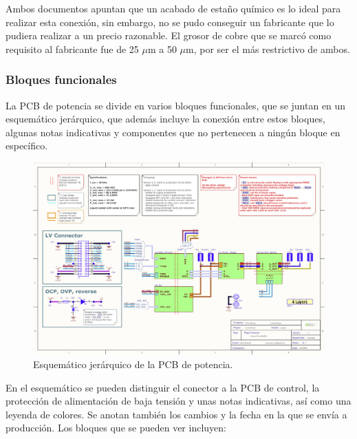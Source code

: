 Ambos documentos apuntan que un acabado de estaño químico es lo ideal para realizar esta conexión, sin embargo, no se pudo conseguir un fabricante que lo pudiera realizar a un precio razonable. El grosor de cobre que se marcó como requisito al fabricante fue de 25 $\mu$m a 50 $\mu$m, por ser el más restrictivo de ambos.

\subsubsection{Bloques funcionales}

La PCB de potencia se divide en varios bloques funcionales, que se juntan en un esquemático jerárquico, que además incluye la conexión entre estos bloques, algunas notas indicativas y componentes que no pertenecen a ningún bloque en específico.

\begin{figure}[H]
	\centering
	\includegraphics[width=0.8\linewidth]{fig/schPower1}
	\caption{Esquemático jerárquico de la PCB de potencia.}
\end{figure}

En el esquemático se pueden distinguir el conector a la PCB de control, la protección de alimentación de baja tensión y unas notas indicativas, así como una leyenda de colores. Se anotan también los cambios y la fecha en la que se envía a producción. Los bloques que se pueden ver incluyen:

